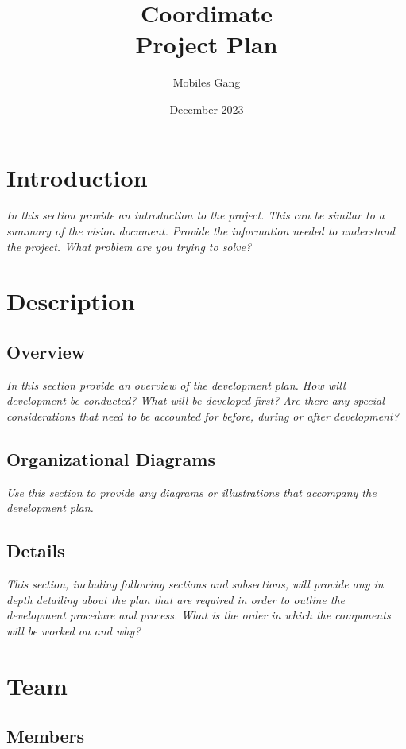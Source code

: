 \documentclass{article}
\title{Coordimate\\Project Plan}
\date{December 2023}
\author{Mobiles Gang}
\begin{document}
\maketitle

\section{Introduction}

\textit{In this section provide an introduction to the project. This can be similar to
a summary of the vision document. Provide the information needed to understand
the project. What problem are you trying to solve?}

\section{Description}

\subsection{Overview}

\textit{In this section provide an overview of the development plan. How will
development be conducted? What will be developed first? Are there any special
considerations that need to be accounted for before, during or after
development?}

\subsection{Organizational Diagrams}

\textit{Use this section to provide any diagrams or illustrations that accompany the
development plan.}

\subsection{Details}

\textit{This section, including following sections and subsections, will provide any
in depth detailing about the plan that are required in order to outline the
development procedure and process. What is the order in which the components
will be worked on and why?}

\section{Team}

\subsection{Members}
\end{document}

